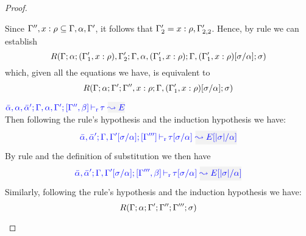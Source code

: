 \begin{proof}
\begin{description}
\begin{enumerate}
  Since $\Gamma'',x:\rho \subseteq \Gamma,\alpha,\Gamma'$, it follows that $\Gamma_2' = x:\rho,\Gamma_{2,2}'$.
  Hence, by rule  we can establish
\begin{equation*}
R(\Gamma;\alpha;(\Gamma_1',x:\rho),\Gamma_2';\Gamma,\alpha,(\Gamma_1',x:\rho);\Gamma,(\Gamma_1',x:\rho)[\sigma/\alpha];\sigma)
\end{equation*}
        which, given all the equations we have, is equivalent to
\begin{equation*}
R(\Gamma;\alpha;\Gamma';\Gamma'',x:\rho;\Gamma,(\Gamma_1',x:\rho)[\sigma/\alpha];\sigma)
\end{equation*}
  \end{enumerate}

\item[\fbox{\rref{L-TyVar}}]\quad$\dlres{\bar{\alpha},\alpha,\bar{\alpha}'}{\tenv,\alpha,\tenv'}{\tenv'',\beta}{\type}{E}$\\

  Then following the rule's hypothesis and the induction hypothesis we have:
\begin{equation*}
  \dlres{\bar{\alpha},\bar{\alpha}'}{\tenv,\tenv'[\suty/\alpha]}{\tenv'''}{\type[\suty/\alpha]}{E[|\suty|/\alpha]}
\end{equation*}
  By rule  and the definition of substitution we then have
\begin{equation*}
  \dlres{\bar{\alpha},\bar{\alpha}'}{\tenv,\tenv'[\suty/\alpha]}{\tenv''',\beta}{\type[\suty/\alpha]}{E[|\suty|/\alpha]}
\end{equation*}
  Similarly, following the rule's hypothesis and the induction hypothesis we have:
\begin{equation*}
  R(\Gamma;\alpha;\Gamma';\Gamma'';\Gamma''';\sigma)
\end{equation*}


\end{description}
\end{proof}
